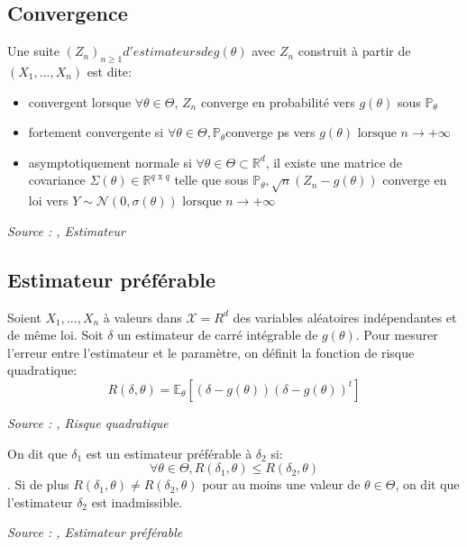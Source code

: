 \subsection{Convergence}

\begin{definition}\label{def:estimateur_convergent}
Une suite $(Z_n)_{n \ge 1} d'estimateurs de g(\theta)$ avec $Z_n$ construit à partir de $(X_1, ..., X_n)$ est dite:
\begin{itemize}
    \item convergent lorsque $\forall \theta \in \Theta$, $Z_n$ converge en probabilité vers $g(\theta)$ sous $\mathbb{P_\theta}$
    \item fortement convergente si $\forall \theta \in \Theta, \mathbb{P}_\theta$converge \gls{ps} vers $g(\theta) \text{ lorsque } n \rightarrow +\infty$
    \item asymptotiquement normale si $\forall \theta \in \Theta \subset \mathbb{R}^d$, il existe une matrice de covariance $\Sigma(\theta) \in \mathbb{R}^{q\text{ x }q}$ telle que sous $\mathbb{P}_\theta, \sqrt{n}(Z_n - g(\theta))$ converge en loi vers $Y \sim \mathcal{N}(0, \sigma(\theta)) \text{ lorsque } n \rightarrow +\infty$ 
\end{itemize}

\noindent\textit{Source : \cite{stat_ingenieur},  Estimateur}
\end{definition}

\subsection{Estimateur préférable}

\begin{definition}\label{def:risque_quadratique}
Soient $X_1, ..., X_n$ à valeurs dans $\mathcal{X} = R^d$ des variables aléatoires indépendantes et de même loi. Soit $\delta$ un estimateur de carré intégrable de $g(\theta)$.
Pour mesurer l'erreur entre l'estimateur et le paramètre, on définit la fonction de risque quadratique:
$$R(\delta, \theta) = \mathbb{E}_\theta[(\delta -g(\theta))(\delta -g(\theta))^t]$$

\noindent\textit{Source : \cite{ensta_cours},  Risque quadratique}
\end{definition}

\begin{definition}\label{def:estimateur_preferable}
On dit que $\delta_1$ est un estimateur préférable à $\delta_2$ si:
$$\forall \theta \in \Theta, R(\delta_1, \theta) \le R(\delta_2, \theta)$$.
Si de plus $R(\delta_1, \theta) \ne R(\delta_2, \theta)$ pour au moins une valeur de $\theta \in \Theta$, on dit que l'estimateur $\delta_2$ est inadmissible.

\noindent\textit{Source : \cite{ensta_cours},  Estimateur préférable}
\end{definition}



